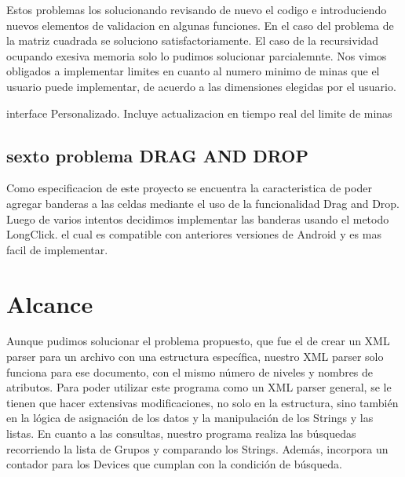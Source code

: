 \documentclass[11pt]{article} %
\begin{document}
Estos problemas los solucionando revisando de nuevo el codigo e introduciendo nuevos elementos de validacion en algunas funciones. 
En el caso del problema de la matriz cuadrada se soluciono satisfactoriamente.
El caso de la recursividad ocupando exesiva memoria solo lo pudimos solucionar parcialemnte. 
Nos vimos obligados a implementar limites en cuanto al numero minimo de minas que el usuario puede implementar, de acuerdo a las dimensiones elegidas por el usuario.

\begin{center}
interface Personalizado. Incluye actualizacion en tiempo real del limite de minas 


\end{center}


\subsection{sexto problema DRAG AND DROP }

Como especificacion de este proyecto se encuentra la caracteristica de poder agregar banderas a las celdas mediante el uso de la funcionalidad Drag and Drop.
Luego de varios intentos decidimos implementar las banderas usando el metodo LongClick. el cual es compatible con anteriores versiones de Android y es mas facil de implementar.







\section{Alcance}

Aunque pudimos solucionar el problema propuesto, que fue el de crear un XML parser para un archivo con una estructura específica, nuestro XML parser solo funciona para ese documento, con el mismo número de niveles y nombres de atributos. Para poder utilizar este programa como un XML parser general, se le tienen que hacer extensivas modificaciones, no solo en la estructura, sino también en la lógica de asignación de los datos y la manipulación de los Strings y las listas.
En cuanto a las consultas, nuestro programa realiza las búsquedas recorriendo la lista de Grupos y comparando los Strings. Además, incorpora un contador para los Devices que cumplan con la condición de búsqueda.
\end{document}
